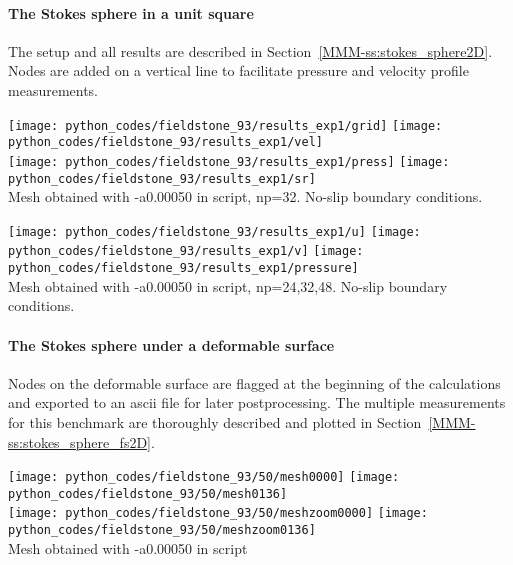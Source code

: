\newpage
\paragraph{The Stokes sphere in a unit square}
The setup and all results are described in Section~\ref{MMM-ss:stokes_sphere2D}.
Nodes are added on a vertical line to facilitate pressure and velocity profile measurements.

\begin{center}
\texttt{[image: python\_codes/fieldstone\_93/results\_exp1/grid]}
\texttt{[image: python\_codes/fieldstone\_93/results\_exp1/vel]}\\
\texttt{[image: python\_codes/fieldstone\_93/results\_exp1/press]}
\texttt{[image: python\_codes/fieldstone\_93/results\_exp1/sr]}\\
{\captionfont  Mesh obtained with -a0.00050 in script, np=32. No-slip boundary conditions.}
\end{center}

\begin{center}
\texttt{[image: python\_codes/fieldstone\_93/results\_exp1/u]}
\texttt{[image: python\_codes/fieldstone\_93/results\_exp1/v]}
\texttt{[image: python\_codes/fieldstone\_93/results\_exp1/pressure]}\\
{\captionfont  Mesh obtained with -a0.00050 in script, np=24,32,48. No-slip boundary conditions.}
\end{center}

\newpage
\paragraph{The Stokes sphere under a deformable surface}

Nodes on the deformable surface are flagged at the beginning of the calculations and 
exported to an ascii file for later postprocessing. The multiple measurements for this 
benchmark are thoroughly described and plotted in Section~\ref{MMM-ss:stokes_sphere_fs2D}.

\begin{center}
\texttt{[image: python\_codes/fieldstone\_93/50/mesh0000]}
\texttt{[image: python\_codes/fieldstone\_93/50/mesh0136]}\\
\texttt{[image: python\_codes/fieldstone\_93/50/meshzoom0000]}
\texttt{[image: python\_codes/fieldstone\_93/50/meshzoom0136]}\\
{\captionfont  Mesh obtained with -a0.00050 in script}
\end{center}

